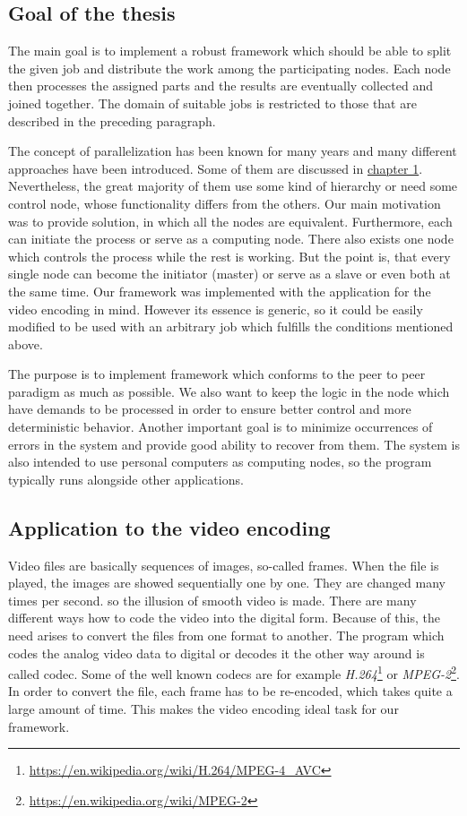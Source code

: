 \subsection*{Goal of the thesis} %
The main goal is to implement a robust framework which should be able to split the given job and  distribute the work among the participating nodes. Each node then processes the assigned parts and the results are eventually collected and joined together. The domain of suitable jobs is restricted to those that are described in the preceding paragraph.

The concept of parallelization has been known for many years and many different approaches have been introduced. Some of them are discussed in \hyperref[existing-solutions]{chapter 1}. Nevertheless, the great majority of them use some kind of hierarchy or need some control node, whose functionality differs from the others. Our main motivation was to provide solution, in which all the nodes are equivalent. Furthermore, each can initiate the process or serve as a computing node. There also exists one node which controls the process while the rest is working. But the point is, that every single node can become the initiator (master) or serve as a slave or even both at the same time. Our framework was implemented with the application for the video encoding in mind. However its essence is generic, so it could be easily modified to be used with an arbitrary job which fulfills the conditions mentioned above.

The purpose is to implement framework which conforms to the peer to peer paradigm as much as possible. We also want to keep the logic in the node which have demands to be processed in order to ensure better control and more deterministic behavior. Another important goal is to minimize occurrences of errors in the system and provide good ability to recover from them. The system is also intended to use personal computers as computing nodes, so the program typically runs alongside other applications.


\subsection*{Application to the video encoding}
Video files are basically sequences of images, so-called frames. When the file is played, the images are showed sequentially one by one. They are changed many times per second. so the illusion of smooth video is made. There are many different ways how to code the video into the digital form. Because of this, the need arises to convert the files from one format to another. The program which codes the analog video data to digital or decodes it the other way around is called codec. Some of the well known codecs are for example \textit{H.264}\footnote{\url{https://en.wikipedia.org/wiki/H.264/MPEG-4\_AVC}} or \textit{MPEG-2}\footnote{\url{https://en.wikipedia.org/wiki/MPEG-2}}. In order to convert the file, each frame has to be re-encoded, which takes quite a large amount of time. This makes the video encoding ideal task for our framework.

